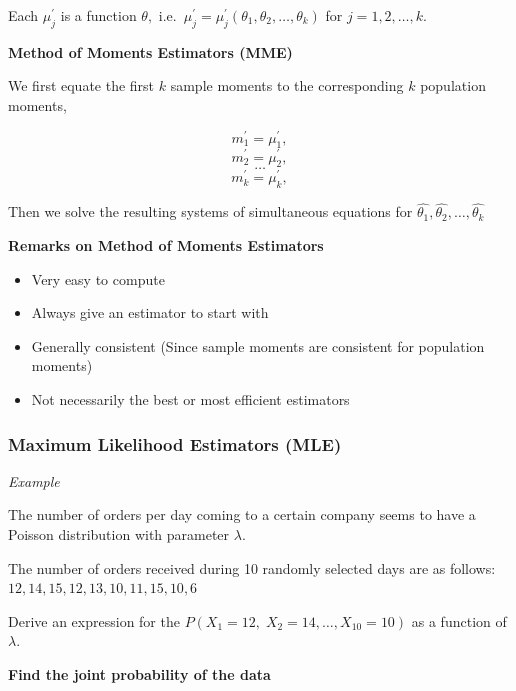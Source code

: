 \documentclass[]{book}
\providecommand{\tightlist}{%
  \setlength{\itemsep}{0pt}\setlength{\parskip}{0pt}}
\begin{document}
Each \(\mu_j^\prime\) is a function \(\theta,\) i.e.~\(\mu_j^\prime= \mu_j^\prime(\theta_1, \theta_2, \dots, \theta_k)\) for \(j=1,2,\dots, k.\)

\textbf{Method of Moments Estimators (MME)}

We first equate the first \(k\) sample moments to the corresponding \(k\) population moments,

\[m_1^\prime = \mu_1^\prime,\]
\[m_2^\prime = \mu_2^\prime,\]
\[\dots\]
\[m_k^\prime = \mu_k^\prime,\]

Then we solve the resulting systems of simultaneous equations for \(\hat{\theta_1}, \hat{\theta_2}, \dots, \hat{\theta_k}\)

\textbf{Remarks on Method of Moments Estimators}

\begin{itemize}
\tightlist
\item
  Very easy to compute
\item
  Always give an estimator to start with
\item
  Generally consistent (Since sample moments are consistent for population moments)
\item
  Not necessarily the best or most efficient estimators
\end{itemize}

\hypertarget{maximum-likelihood-estimators-mle}{%
\subsubsection{Maximum Likelihood Estimators (MLE)}\label{maximum-likelihood-estimators-mle}}

\emph{Example}

The number of orders per day coming to a certain company seems to have a Poisson distribution with parameter \(\lambda\).

The number of orders received during 10 randomly selected days are as follows:
\(12,14,15,12,13,10,11,15,10,6\)

Derive an expression for the \(P(X_1=12, \; X_2 = 14, \dots, X_{10} = 10)\) as a function of \(\lambda.\)

\newpage

\textbf{Find the joint probability of the data}
\end{document}
